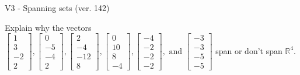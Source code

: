 \begin{exercise}
  \begin{exerciseTitle}V3 - Spanning sets (ver. 142)\end{exerciseTitle}
  \begin{exerciseStatement}
    Explain why the vectors \(\left[\begin{array}{r}
1 \\
3 \\
-2 \\
2
\end{array}\right] , \left[\begin{array}{r}
0 \\
-5 \\
-4 \\
2
\end{array}\right] , \left[\begin{array}{r}
2 \\
-4 \\
-12 \\
8
\end{array}\right] , \left[\begin{array}{r}
0 \\
10 \\
8 \\
-4
\end{array}\right] , \left[\begin{array}{r}
-4 \\
-2 \\
-2 \\
-2
\end{array}\right] , \text{ and } \left[\begin{array}{r}
-3 \\
-3 \\
-5 \\
-5
\end{array}\right]\) span or don't span \(\mathbb{R}^4\). 
	



\end{exerciseStatement}
\end{exercise}
